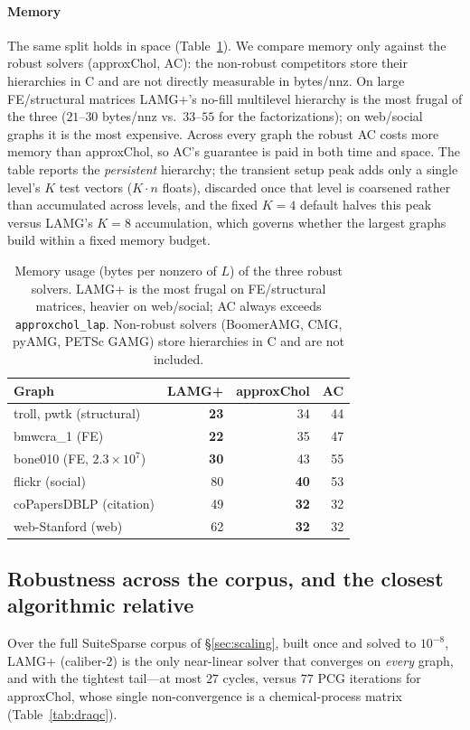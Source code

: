 \documentclass{siamart220329}
\begin{document}
\paragraph{Memory} The same split holds in space (Table~\ref{tab:memory}). We compare memory only
against the robust solvers (approxChol, AC): the non-robust competitors store their hierarchies in
C and are not directly measurable in bytes/nnz. On large FE/structural matrices LAMG+'s no-fill
multilevel hierarchy is the most frugal of the three ($21$--$30$ bytes/nnz vs.\
$33$--$55$ for the factorizations); on web/social graphs it is the most expensive. Across every graph the robust AC costs more memory than
approxChol, so AC's guarantee is paid in both time and space. The table
reports the \emph{persistent} hierarchy; the transient setup peak adds only a single level's
$K$ test vectors ($K{\cdot}n$ floats), discarded once that level is coarsened rather than accumulated
across levels, and the fixed $K{=}4$ default halves this peak versus LAMG's $K{=}8$
accumulation, which governs whether the largest graphs build within a fixed memory budget.

\begin{table}[t]\centering
\caption{Memory usage (bytes per nonzero of $L$) of the three robust solvers.
LAMG+ is the most frugal on FE/structural matrices, heavier on web/social; AC always
exceeds \texttt{approxchol\_lap}. Non-robust solvers (BoomerAMG, CMG, pyAMG, PETSc GAMG)
store hierarchies in C and are not included.}\label{tab:memory}
\begin{tabular}{lrrr}
\toprule
Graph & LAMG+ & approxChol & AC\\
\midrule
troll, pwtk (structural)   & \textbf{23} & 34 & 44\\
bmwcra\_1 (FE)             & \textbf{22} & 35 & 47\\
bone010 (FE, $2.3\!\times\!10^7$) & \textbf{30} & 43 & 55\\
flickr (social)            & 80 & \textbf{40} & 53\\
coPapersDBLP (citation)    & 49 & \textbf{32} & 32\\
web-Stanford (web)         & 62 & \textbf{32} & 32\\
\bottomrule
\end{tabular}
\end{table}

\subsection{Robustness across the corpus, and the closest algorithmic relative}\label{sec:draqc}
Over the full SuiteSparse corpus of \S\ref{sec:scaling}, built once and solved to $10^{-8}$, LAMG+
(caliber-2) is the only near-linear solver that converges on \emph{every} graph, and with the
tightest tail---at most $27$ cycles, versus $77$ PCG iterations for approxChol, whose single
non-convergence is a chemical-process matrix (Table~\ref{tab:draqc}).
\end{document}
